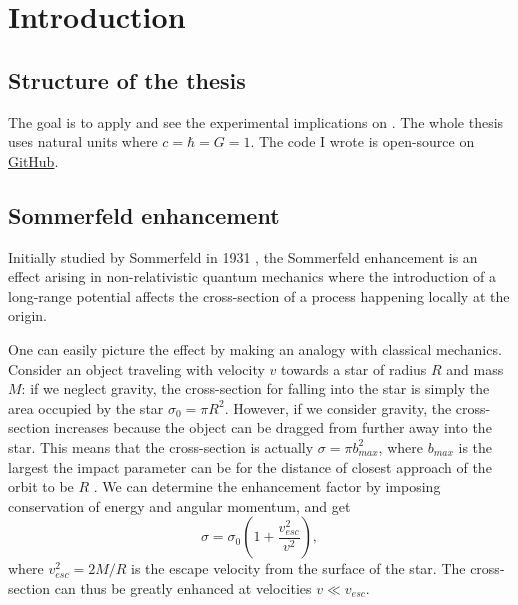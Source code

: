 \chapter{Introduction}

\section{Structure of the thesis}

The goal is to apply \cite{Arkani_2009} and see the experimental implications on \cite{Profumo_2018}. The whole thesis uses natural units where \(c=\hbar=G=1\). The code I wrote is open-source on \href{https://github.com/LuckeeDev/bachelor-thesis}{GitHub}.

\section{Sommerfeld enhancement}

Initially studied by Sommerfeld in 1931 \cite{Sommerfeld_1931}, the Sommerfeld enhancement is an effect arising in non-relativistic quantum mechanics where the introduction of a long-range potential affects the cross-section of a process happening locally at the origin.

One can easily picture the effect by making an analogy with classical mechanics. Consider an object traveling with velocity \(v\) towards a star of radius \(R\) and mass \(M\): if we neglect gravity, the cross-section for falling into the star is simply the area occupied by the star \(\sigma _0=\pi R^2\). However, if we consider gravity, the cross-section increases because the object can be dragged from further away into the star. This means that the cross-section is actually \(\sigma = \pi b_{max}^2 \), where \(b_{max}\) is the largest the impact parameter can be for the distance of closest approach of the orbit to be \(R\) \cite{Arkani_2009, Cirelli_2024}. We can determine the enhancement factor by imposing conservation of energy and angular momentum, and get
\begin{equation}
	\sigma = \sigma _0 \left( 1+ \frac{v_{esc} ^2}{v ^2} \right), 
\end{equation}
where \(v_{esc} ^2 = 2M / R\) is the escape velocity from the surface of the star. The cross-section can thus be greatly enhanced at velocities \(v \ll v_{esc} \).

